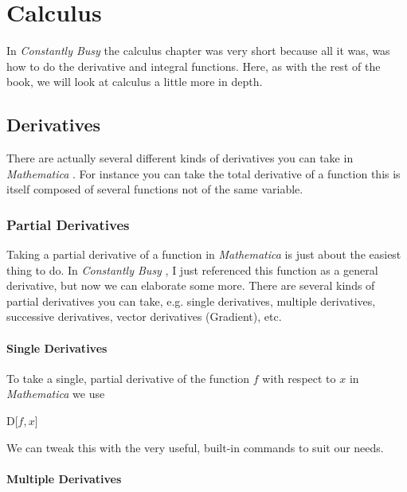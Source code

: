 \documentclass[11pt,letterpaper,twoside,titlepage]{book}
\newcommand{\Mathematica}{\textit{Mathematica} }
\newcommand{\CB}{\emph{Constantly Busy} }
\begin{document}
		\chapter{Calculus}
		
			In \CB the calculus chapter was very short because all it was, was how to do the derivative and integral functions.  Here, as with the rest of the book, we will look at calculus a little more in depth.
			
			\section{Derivatives}
			
				There are actually several different kinds of derivatives you can take in \Mathematica.  For instance you can take the total derivative of a function this is itself composed of several functions not of the same variable.
				
				\subsection{Partial Derivatives}
				
					Taking a partial derivative of a function in \Mathematica is just about the easiest thing to do. In \CB, I just referenced this function as a general derivative, but now we can elaborate some more.  There are several kinds of partial derivatives you can take, e.g. single derivatives, multiple derivatives, successive derivatives, vector derivatives (Gradient), etc.  
					
					\subsubsection{Single Derivatives}
					
						To take a single, partial derivative of the function $f$ with respect to $x$ in \Mathematica we use 
					
						\begin{center}
					
							D[$f,x$]
					
						\end{center}
					
						We can tweak this with the very useful, built-in commands to suit our needs.
					
					\subsubsection{Multiple Derivatives}
				
\end{document}
